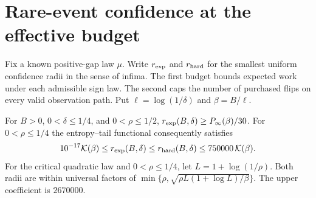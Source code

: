 \section{Rare-event confidence at the effective budget}
\label{app:known-confidence}

Fix a known positive-gap law $\mu$. Write $r_{\rm exp}$ and $r_{\rm hard}$
for the smallest uniform confidence radii in the sense of infima. The first
budget bounds expected work under each admissible sign law. The second
caps the number of purchased flips on every valid observation path.
Put $\ell=\log(1/\delta)$ and $\beta=B/\ell$.

\begin{theorem}\label{thm:confidence-stopping-dual}
For $B>0$, $0<\delta\le1/4$, and $0<\rho\le1/2$,
$r_{\rm exp}(B,\delta)\ge P_\infty(\beta)/30$.
For $0<\rho\le1/4$ the entropy--tail functional consequently satisfies
\[
 10^{-17}\mathcal K(\beta)\le r_{\rm exp}(B,\delta)
 \le r_{\rm hard}(B,\delta)\le 750000\,\mathcal K(\beta).
\]
For the critical quadratic law and $0<\rho\le1/4$, let
$L=1+\log(1/\rho)$. Both radii are
within universal factors of $\min\{\rho,\sqrt{\rho L(1+\log L)/\beta}\}$.
The upper coefficient is $2670000$.
\end{theorem}

